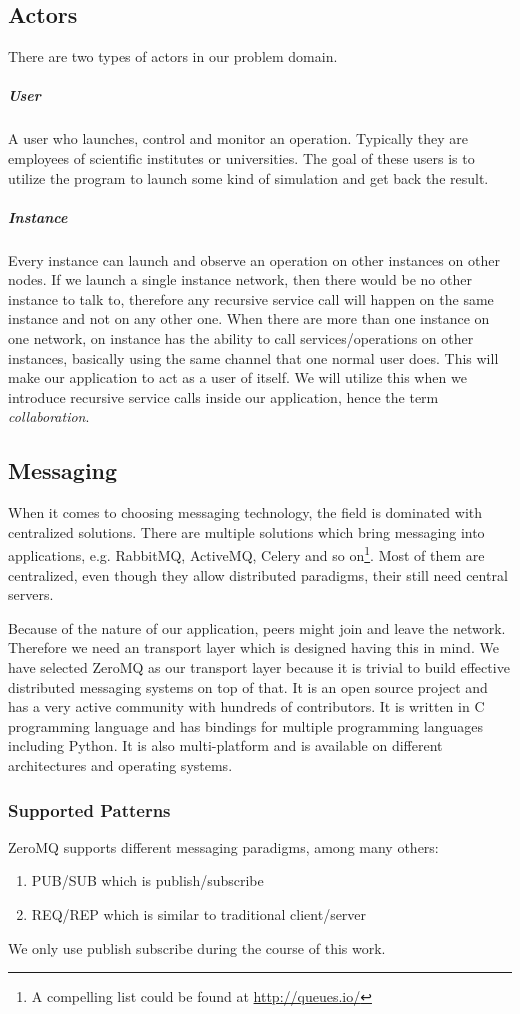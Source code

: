 \subsection{Actors}
There are two types of actors in our problem domain.
\subparagraph{User}
A user who launches, control and monitor an operation. Typically they are employees of scientific institutes or universities.
The goal of these users is to utilize the program to launch some kind of simulation and get back the result.
\subparagraph{Instance}
Every instance can launch and observe an operation on other instances on other nodes. If we launch a single instance
network, then there would be no other instance to talk to, therefore any recursive service call will happen on the
same instance and not on any other one.
When there are more than one instance on one network, on instance has the ability to call services/operations on other
instances, basically using the same channel that one normal user does. This will make our application to act as a user
of itself. We will utilize this when we introduce recursive service calls inside our application, hence the term
\textit{collaboration}.

\subsection{Messaging}
When it comes to choosing messaging technology, the field is dominated with centralized solutions.
There are multiple solutions which bring messaging into applications, 
e.g. RabbitMQ, ActiveMQ, Celery and so on\footnote{A compelling list could be found at \url{http://queues.io/}}.
Most of them are centralized, even though they allow
distributed paradigms, their still need central servers.

Because of the nature of our application, peers might join and leave the network.
Therefore we need an transport layer which is designed having this in mind. 
We have selected ZeroMQ as our transport layer 
because it is trivial to build effective distributed messaging systems on top of that.
It is an open source project and has a very active community with hundreds of contributors. 
It is written in C programming language and has bindings for multiple programming languages including Python.
It is also multi-platform and is available on different architectures and operating systems.

\subsubsection{Supported Patterns}
ZeroMQ supports different messaging paradigms, among many others:
\begin{enumerate}
\item PUB/SUB which is publish/subscribe
\item REQ/REP which is similar to traditional client/server
\end{enumerate}
We only use publish subscribe during the course of this work.

